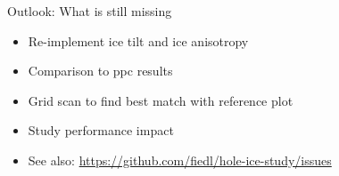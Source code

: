 
\begin{frame}{Outlook: What is still missing}
  \begin{itemize}
    \item Re-implement ice tilt and ice anisotropy
    \item Comparison to ppc results
    \item Grid scan to find best match with reference plot
    \item Study performance impact
    \item See also: \url{https://github.com/fiedl/hole-ice-study/issues}
  \end{itemize}
\end{frame}
